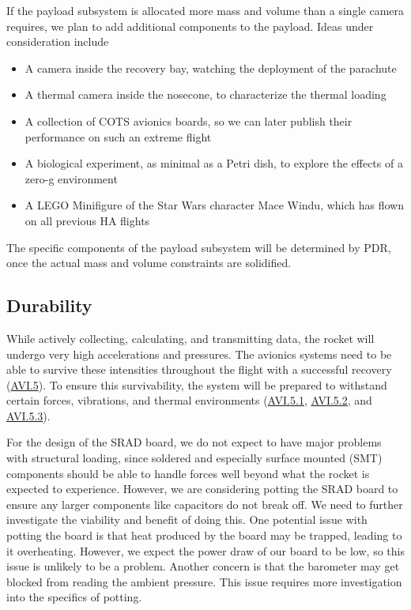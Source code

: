 If the payload subsystem is allocated more mass and volume than a single camera requires, we plan to add additional components to the payload. Ideas under consideration include

\begin{itemize}
    \item A camera inside the recovery bay, watching the deployment of the parachute
    \item A thermal camera inside the nosecone, to characterize the thermal loading
    \item A collection of COTS avionics boards, so we can later publish their performance on such an extreme flight
    \item A biological experiment, as minimal as a Petri dish, to explore the effects of a zero-g environment
    \item A LEGO Minifigure of the Star Wars character Mace Windu, which has flown on all previous HA flights
\end{itemize}

The specific components of the payload subsystem will be determined by PDR, once the actual mass and volume constraints are solidified.


\subsection{Durability}
While actively collecting, calculating, and transmitting data, the rocket will undergo very high accelerations and pressures. The avionics systems need to be able to survive these intensities throughout the flight with a successful recovery (\hyperlink{AVI.5}{AVI.5}). To ensure this survivability, the system will be prepared to withstand certain forces, vibrations, and thermal environments (\hyperlink{AVI.5.1}{AVI.5.1}, \hyperlink{AVI.5.2}{AVI.5.2}, and \hyperlink{AVI.5.3}{AVI.5.3}).

For the design of the SRAD board, we do not expect to have major problems with structural loading, since soldered and especially surface mounted (SMT) components should be able to handle forces well beyond what the rocket is expected to experience. However, we are considering potting the SRAD board to ensure any larger components like capacitors do not break off. We need to further investigate the viability and benefit of doing this. One potential issue with potting the board is that heat produced by the board may be trapped, leading to it overheating. However, we expect the power draw of our board to be low, so this issue is unlikely to be a problem. Another concern is that the barometer may get blocked from reading the ambient pressure. This issue requires more investigation into the specifics of potting.

